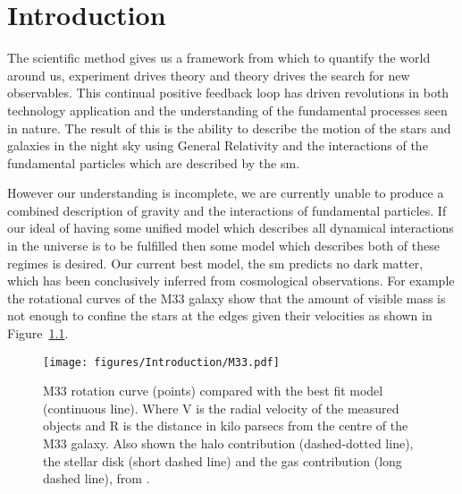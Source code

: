\chapter{Introduction} %
\label{cha:introduction}

The scientific method gives us a framework from which to quantify the world 
around us, experiment drives theory and theory drives the search for new 
observables. This continual positive feedback loop has driven revolutions in 
both technology application and the understanding of the fundamental processes 
seen in nature. The result of this is the ability to describe the motion of the 
stars and galaxies in the night sky using General Relativity and the 
interactions of the fundamental particles which are described by the \ac{sm}.


However our understanding is incomplete, we are currently unable to produce a 
combined description of gravity and the interactions of fundamental particles. 
If our ideal of having some unified model which describes all dynamical 
interactions in the universe is to be fulfilled then some model which describes 
both of these regimes is desired.
Our current best model, the \ac{sm} predicts no dark matter, which has been 
conclusively inferred from cosmological observations. For example the 
rotational curves of the M33 galaxy\cite{Corbelli1999af} show that the amount 
of visible mass is not enough to confine the stars at the edges given their 
velocities as shown in Figure~\ref{fig:M33RotationalCurve}.
\begin{figure}
 \texttt{[image: figures/Introduction/M33.pdf]}
\caption{ M33 rotation curve (points) compared with the best fit model
          (continuous line). Where V is the radial velocity of the measured
          objects and R is the distance in kilo parsecs from the centre of
          the M33 galaxy. Also shown  the halo contribution (dashed-dotted 
          line), the stellar disk (short dashed line) and  the gas contribution 
          (long dashed line), from \cite{Corbelli1999af}.
          }
\label{fig:M33RotationalCurve}
\end{figure}

